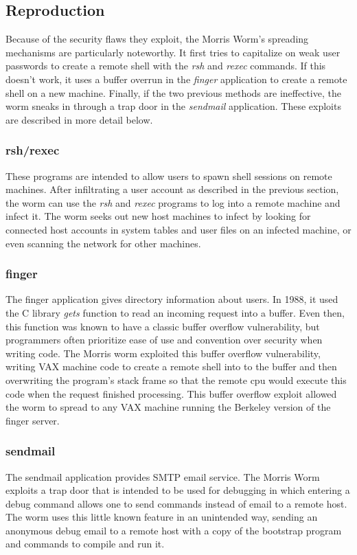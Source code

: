 \subsection*{Reproduction}
Because of the security flaws they exploit, the Morris Worm's spreading
mechanisms are particularly noteworthy. It first tries to capitalize on weak
user passwords to create a remote shell with the \textit{rsh} and \textit{rexec}
commands.
If this doesn't work, it uses a buffer overrun in the \textit{finger}
application to create a remote shell on a new machine. Finally, if the two
previous methods are ineffective, the worm sneaks in through a trap door in the
\textit{sendmail} application. These exploits are described in more detail
below.
\subsubsection*{rsh/rexec}
These programs are intended to allow users to spawn shell sessions on remote
machines. After infiltrating a user account as described in the previous
section, the worm can use the \textit{rsh} and \textit{rexec} programs to log
into a remote machine and infect it. The worm seeks out new host machines to
infect by looking for connected host accounts in
system tables and user files on an infected machine, or even scanning the
network for other machines.

\subsubsection*{finger}
The finger application gives directory information about users. In 1988, it used
the C library \textit{gets} function to read an incoming request into a buffer.
Even then, this function was known to have a classic buffer overflow
vulnerability, but programmers often prioritize ease of use and convention over security when
writing code. The Morris worm exploited this buffer overflow vulnerability,
writing VAX machine code to create a remote shell into to the buffer and then
overwriting the program's stack frame so that the remote cpu would execute
this code when the request finished processing. This buffer overflow exploit
allowed the worm to spread to any VAX machine running the Berkeley version of the finger server.

\subsubsection*{sendmail}
The sendmail application provides SMTP email service. The Morris Worm exploits
a trap door that is intended to be used for debugging in which entering a debug
command allows one to send commands instead of email to a remote host. The worm uses
this little known feature in an unintended way, sending an anonymous debug email
to a remote host with a copy of the bootstrap program and commands to compile and run
it. 



